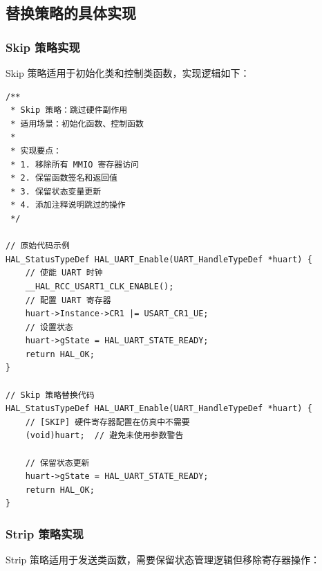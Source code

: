 \subsection{替换策略的具体实现}

\subsubsection{Skip 策略实现}

Skip 策略适用于初始化类和控制类函数，实现逻辑如下：

\begin{lstlisting}[style=CStyle,abovecaptionskip=0pt,belowcaptionskip=0pt]
/**
 * Skip 策略：跳过硬件副作用
 * 适用场景：初始化函数、控制函数
 *
 * 实现要点：
 * 1. 移除所有 MMIO 寄存器访问
 * 2. 保留函数签名和返回值
 * 3. 保留状态变量更新
 * 4. 添加注释说明跳过的操作
 */

// 原始代码示例
HAL_StatusTypeDef HAL_UART_Enable(UART_HandleTypeDef *huart) {
    // 使能 UART 时钟
    __HAL_RCC_USART1_CLK_ENABLE();
    // 配置 UART 寄存器
    huart->Instance->CR1 |= USART_CR1_UE;
    // 设置状态
    huart->gState = HAL_UART_STATE_READY;
    return HAL_OK;
}

// Skip 策略替换代码
HAL_StatusTypeDef HAL_UART_Enable(UART_HandleTypeDef *huart) {
    // [SKIP] 硬件寄存器配置在仿真中不需要
    (void)huart;  // 避免未使用参数警告
    
    // 保留状态更新
    huart->gState = HAL_UART_STATE_READY;
    return HAL_OK;
}
\end{lstlisting}

\subsubsection{Strip 策略实现}

Strip 策略适用于发送类函数，需要保留状态管理逻辑但移除寄存器操作：

